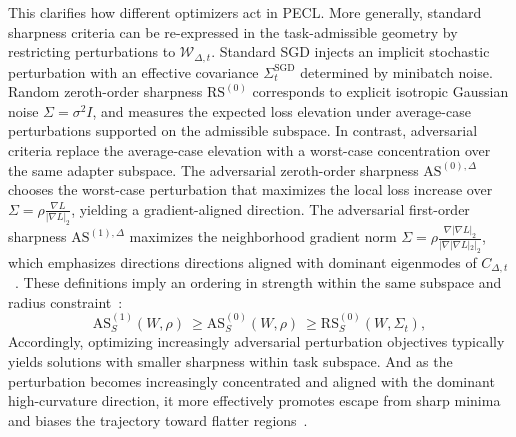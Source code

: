 \documentclass{article}
\theoremstyle{plain}
\theoremstyle{definition}
\theoremstyle{remark}
\begin{document}
This clarifies how different optimizers act in PECL. More generally, standard sharpness criteria can be re-expressed in the task-admissible geometry by restricting perturbations to $\mathcal W_{\Delta,t}$. Standard SGD injects an implicit stochastic perturbation with an effective covariance $\Sigma_t^{\mathrm{SGD}}$ determined by minibatch noise\cite{pmlr-v97-zhu19e}. Random zeroth-order sharpness $\mathrm{RS}^{(0)}$ corresponds to explicit isotropic Gaussian noise $\Sigma=\sigma^2 I$, and measures the expected loss elevation under average-case perturbations supported on the admissible subspace. In contrast, adversarial criteria replace the average-case elevation with a worst-case concentration over the same adapter subspace. The adversarial zeroth-order sharpness $\mathrm{AS}^{(0),\Delta}$ chooses the worst-case perturbation that maximizes the local loss increase over $\Sigma=\rho\frac{\nabla L}{|\nabla L|_2}$, yielding a gradient-aligned direction\cite{foretSharpnessAwareMinimizationEfficiently2021}. The adversarial first-order sharpness $\mathrm{AS}^{(1),\Delta}$ maximizes the neighborhood gradient norm
$\Sigma=\rho\frac{\nabla|\nabla L|_2}{|\nabla|\nabla L|_2|_2}$,
which emphasizes directions directions aligned with dominant eigenmodes of $C_{\Delta,t}$~\cite{zhangGradientNormAware2023}. These definitions imply an ordering in strength within the same subspace and radius constraint~\cite{mollenhoffSAMOptimalRelaxation2022,Zhang_GAM}:
{%
\setlength{\abovedisplayskip}{3pt}
\setlength{\belowdisplayskip}{3pt}
\setlength{\abovedisplayshortskip}{1pt}
\setlength{\belowdisplayshortskip}{1pt}
\begin{equation*}
    \mathrm{AS}^{(1)}_S(W,\rho)\ \ge \mathrm{AS}^{(0)}_S(W,\rho)\ \ge \mathrm{RS}^{(0)}_S(W,\Sigma_t),
\end{equation*}
}
Accordingly, optimizing increasingly adversarial perturbation objectives typically yields solutions with smaller sharpness within task subspace. And as the perturbation becomes increasingly concentrated and aligned with the dominant high-curvature direction, it more effectively promotes escape from sharp minima and biases the trajectory toward flatter regions~\cite{pmlr-v97-zhu19e,chen2026sharpnessflatnessdecompositionframework}.
\end{document}
